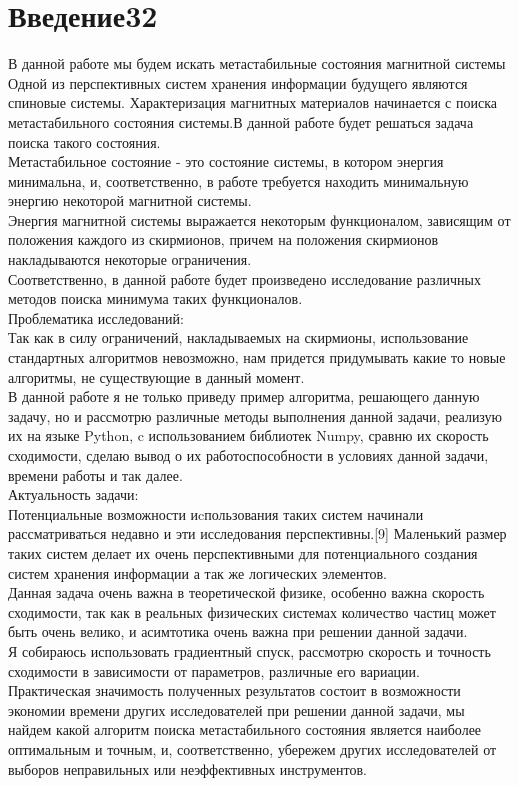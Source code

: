 \documentclass[ 12pt,x11names]{article}
\begin{document}
    \tableofcontents %
    \clearpage
    \section{Введение32}    \noindent
    В данной работе мы будем искать метастабильные состояния магнитной системы\\
    Одной из перспективных систем хранения информации будущего являются спиновые системы. Характеризация магнитных материалов начинается с  поиска метастабильного состояния системы.В данной работе будет решаться задача поиска такого состояния.\\
        Метастабильное состояние - это состояние системы, в котором энергия минимальна, и, соответственно, в работе требуется находить минимальную энергию некоторой магнитной системы.\\
    Энергия магнитной системы выражается некоторым функционалом, зависящим от положения каждого из скирмионов, причем на положения скирмионов накладываются некоторые ограничения. \\Соответственно, в данной работе будет произведено исследование различных методов поиска минимума таких функционалов.\\
    Проблематика исследований:\\
     Так как в силу ограничений, накладываемых на скирмионы, использование стандартных алгоритмов невозможно, нам придется придумывать какие то новые алгоритмы, не существующие в данный момент.\\
    В данной работе я не только приведу пример алгоритма, решающего данную задачу, но и   рассмотрю различные методы выполнения данной задачи, реализую их на языке Python, c использованием библиотек Numpy, сравню их скорость сходимости, сделаю вывод о их работоспособности в условиях данной задачи, времени работы и так далее.\\
    Актуальность задачи:\\
     Потенциальные возможности иcпользования таких систем начинали рассматриваться недавно и эти исследования перспективны.[9]
     Маленький размер таких систем делает их очень перспективными для потенциального создания систем хранения информации а так же логических элементов.\\
    Данная задача очень важна в теоретической физике, особенно важна скорость сходимости, так как в реальных физических системах количество частиц может быть очень велико, и асимтотика очень важна при решении данной задачи.\\
    Я собираюсь использовать градиентный спуск, рассмотрю скорость и точность сходимости в зависимости от параметров, различные его вариации.\\
     Практическая значимость полученных результатов состоит в возможности экономии времени других исследователей при решении данной задачи, мы найдем какой алгоритм поиска метастабильного состояния является наиболее оптимальным и точным, и, соответственно, убережем других исследователей от выборов неправильных или неэффективных инструментов.\\
\end{document}
